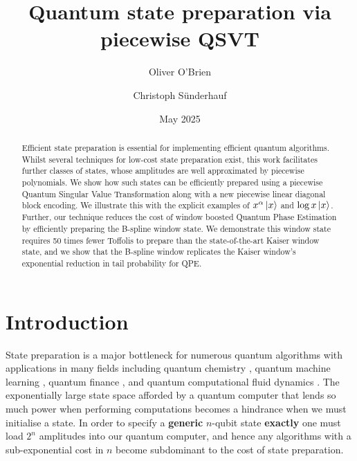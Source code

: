 \documentclass[a4paper,twocolumn,,accepted=2025-05-27]{quantumarticle}
\theoremstyle{empty}
\begin{document}
\title{Quantum state preparation via piecewise QSVT}

\author{Oliver O'Brien}
\author{Christoph S{\"u}nderhauf}
\date{May 2025}

\begin{abstract}
    Efficient state preparation is essential for implementing efficient quantum algorithms. Whilst several techniques for low-cost state preparation exist, this work facilitates further classes of states, whose amplitudes are well approximated by piecewise polynomials. We show how such states can be efficiently prepared using a piecewise Quantum Singular Value Transformation along with a new piecewise linear diagonal block encoding. We illustrate this with the explicit examples of $x^\alpha\ket{x}$ and $\log x\ket{x}$. Further, our technique reduces the cost of window boosted Quantum Phase Estimation by efficiently preparing the B-spline window state. We demonstrate this window state requires 50 times fewer Toffolis to prepare than the state-of-the-art Kaiser window state, and we show that the B-spline window replicates the Kaiser window's exponential reduction in tail probability for QPE.
\end{abstract}

\maketitle

\tableofcontents

\section{Introduction}
State preparation is a major bottleneck for numerous quantum algorithms with applications in many fields including quantum chemistry \cite{Aspuru_Guzik_2005,RevModPhys.92.015003, PRXQuantum.2.040332, Huggins:2024hpa}, quantum machine learning \cite{Aaronson:2015scy}, quantum finance \cite{Chakrabarti2021thresholdquantum, Gonzalez-Conde:2021zbv, PhysRevE.103.063302, Dalzell:2022ysw}, and quantum computational fluid dynamics \cite{Lapworth:2022rcw}. The exponentially large state space afforded by a quantum computer that lends so much power when performing computations becomes a hindrance when we must initialise a state. In order to specify a \textbf{generic} $n$-qubit state \textbf{exactly} one must load $2^n$ amplitudes into our quantum computer, and hence any algorithms with a sub-exponential cost in $n$ become subdominant to the cost of state preparation. 
\end{document}
